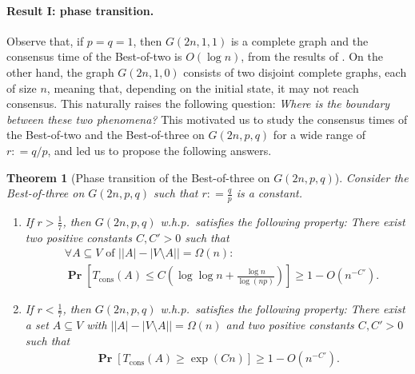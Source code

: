 \documentclass[letterpaper,11pt]{article}
\newtheorem{theorem}{Theorem}[section]
\newcommand{\Tcons}{T_{\mathrm{cons}}}
\renewcommand\Pr{\mathop{\mathbf{Pr}}}
\def\defeq{\mathrel{\mathop:}=}%
\begin{document}
\paragraph*{Result I: phase transition.}
Observe that, if $p=q=1$, then $G(2n,1,1)$ is a complete graph and the consensus time of the Best-of-two is $O(\log n)$, from the results of \cite{DGMSS11}.
On the other hand, the graph $G(2n,1,0)$ consists of two disjoint complete graphs, each of size $n$,
meaning that, depending on the initial state, it may not reach consensus. 
This naturally raises the following question:
{\em Where is the boundary between these two phenomena?}
This motivated us to study the consensus times of the Best-of-two and the Best-of-three on $G(2n,p,q)$ for a wide range of $r\defeq q/p$, and led us to propose the following answers.
%
\begin{theorem}[Phase transition of the Best-of-three on $G(2n,p,q)$] \label{thm:phasetransition_3M}
Consider the Best-of-three on $G(2n,p,q)$ such that $r\defeq \frac{q}{p}$ is a constant.

\begin{enumerate}[label=(\roman*)]
\item\label{state:abovethroshold_3M}
If $r>\frac{1}{7}$, then $G(2n,p,q)$ w.h.p.~satisfies the following property:
%
There exist two positive constants $C, C'>0$ such that
\begin{align*}
&\forall A\subseteq V\text{ of $\bigl||A|-|V\setminus A|\bigr|= \Omega(n)$}
:\\
&\Pr\left[\Tcons(A)\leq C\left(\log\log n+\frac{\log n}{\log(np)}\right)\right] \geq 1-O\left(n^{-C'}\right).
\end{align*}
%
\item\label{state:belowthroshold_3M} 
If $r<\frac{1}{7}$, then $G(2n,p,q)$ w.h.p.~satisfies the following property:
%
There exist a set $A\subseteq V$ with $\bigl||A|-|V\setminus A|\bigr|= \Omega(n)$ and two positive constants $C, C'>0$ such that
\begin{align*}
\Pr\left[\Tcons(A) \geq \exp(Cn) \right] \geq 1-O\left(n^{-C'}\right).
\end{align*}
%
\end{enumerate}
\end{theorem}
\end{document}
